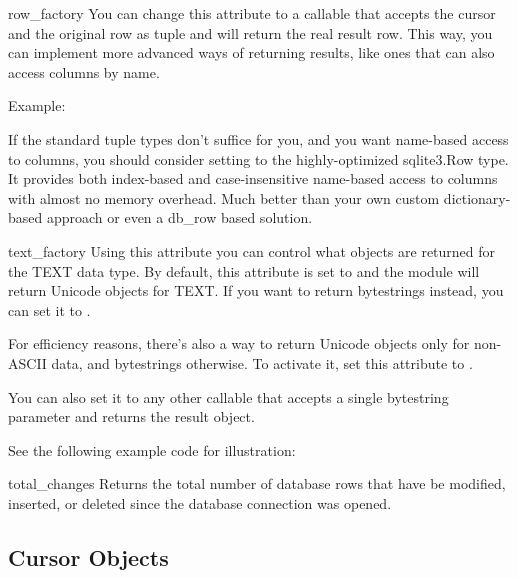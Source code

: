 \begin{memberdesc}{row_factory}
  You can change this attribute to a callable that accepts the cursor and
  the original row as tuple and will return the real result row.  This
  way, you can implement more advanced ways of returning results, like
  ones that can also access columns by name.

  Example:

  

  If the standard tuple types don't suffice for you, and you want name-based
  access to columns, you should consider setting  to the
  highly-optimized sqlite3.Row type. It provides both
  index-based and case-insensitive name-based access to columns with almost
  no memory overhead. Much better than your own custom dictionary-based
  approach or even a db_row based solution.
\end{memberdesc}

\begin{memberdesc}{text_factory}
  Using this attribute you can control what objects are returned for the
  TEXT data type. By default, this attribute is set to  and
  the  module will return Unicode objects for TEXT. If you want to return
  bytestrings instead, you can set it to .

  For efficiency reasons, there's also a way to return Unicode objects only
  for non-ASCII data, and bytestrings otherwise. To activate it, set this
  attribute to .

  You can also set it to any other callable that accepts a single bytestring
  parameter and returns the result object.

  See the following example code for illustration:

  
\end{memberdesc}

\begin{memberdesc}{total_changes}
  Returns the total number of database rows that have be modified, inserted,
  or deleted since the database connection was opened.
\end{memberdesc}





\subsection{Cursor Objects \label{sqlite3-Cursor-Objects}}

